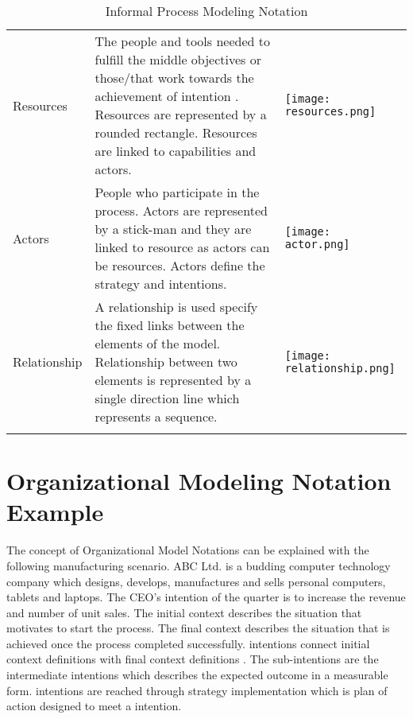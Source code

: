 \begin{center}
\begin{longtable}{p{3cm}p{10cm}p{3cm}}
		Resources					& The people and tools needed to fulfill the middle objectives or those/that work towards the achievement of intention . Resources are represented by a rounded rectangle. Resources are linked to capabilities and actors. & \begin{center} \texttt{[image: resources.png]} \end{center}   \\
		
		Actors					& People who participate in the process. Actors are represented by a stick-man and they are linked to resource as actors can be resources. Actors define the strategy and intentions.  & \begin{center} \texttt{[image: actor.png]} \end{center}   \\
		
		Relationship				& A relationship is used specify the fixed links between the elements of the model. Relationship between two elements is represented by a single direction line which represents a sequence.  & \begin{center} \texttt{[image: relationship.png]} \end{center}   \\
		
		
		\bottomrule
		\caption{Informal Process Modeling Notation}
		\label{tab:notations}		
	\end{longtable}	
\end{center}


\section{Organizational Modeling Notation Example}
\hspace{4ex} The concept of Organizational Model Notations can be explained with the following manufacturing scenario. ABC Ltd. is a budding computer technology company which designs, develops, manufactures and sells personal computers, tablets and laptops. The CEO's intention of the quarter is to increase the revenue and number of unit sales. The initial context describes the situation that motivates to start the process. The final context describes the situation that is achieved once the process completed successfully. intentions connect initial context definitions with final context definitions \cite{Sungur2014a}. The sub-intentions are the intermediate intentions which describes the expected outcome in a measurable form. intentions are reached through strategy implementation which is plan of action designed to meet a intention. 


